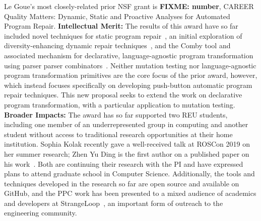 Le Goue's most closely-related prior NSF grant is \textbf{FIXME: number}, CAREER
Quality Matters: Dynamic, Static and Proactive Analyses for Automated Program
Repair.  \textbf{Intellectual Merit:} The results of this award have so far
included novel techniques for static program repair~\cite{footpatch}, an initial
exploration of diversity-enhancing dynamic repair
techniques~\cite{Ding2019}, and the Comby tool and associated mechanism for
declarative, language-agnostic program transformation using parser parser
combinators~\cite{rvt-ppc}.  Neither mutation testing nor language-agnostic
program transformation primitives are the core focus of the prior award,
however, which instead focuses specifically on developing push-button automatic
program repair techniques. This new proposal seeks to extend the work on
declarative program transformation, with a particular application to mutation
testing. \textbf{Broader Impacts:} The award has so far supported two REU
students, including one member of an underrepresented group in computing and
another student without access to traditional research opportunities at their
home institution.  Sophia Kolak recently gave a well-received talk at ROSCon
2019 on her summer research; Zhen Yu Ding is the first author on a published
paper on his work~\cite{Ding2019}.  Both are continuing their research with
the PI and have expressed plans to attend graduate school in Computer Science.
Additionally, the tools and techniques developed in the research so far are open
source and available on GitHub, and the PPC work has been presented to a mixed
audience of academics and developers at StrangeLoop~\cite{strangeloop}, an
important form of outreach to the engineering community.
